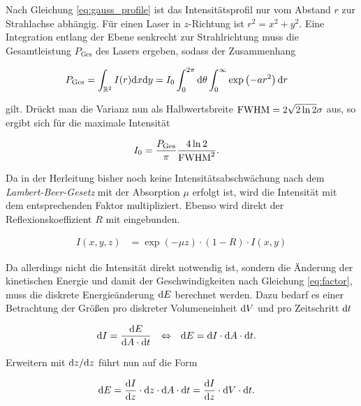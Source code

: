 		Nach Gleichung \eqref{eq:gauss_profile} ist das Intensitätsprofil nur vom Abstand $r$
		zur Strahlachse abhängig. Für einen Laser in $z$-Richtung ist $r^2 = x^2 + y^2$. Eine
		Integration entlang der Ebene senkrecht zur Strahlrichtung muss die Gesamtleistung
		$P_\text{Ges}$ des Lasers ergeben, sodass der Zusammenhang

		\begin{align}
			P_\text{Ges} &= \int_{\mathbb{R}^2} I(r) \dx\dx[y]
				= I_0 \int_0^{2\pi} \dx[\theta] \int_0^\infty \exp\left(-a r^2\right) \dx[r]
		\end{align}

		gilt. Drückt man die Varianz nun als Halbwertsbreite $\fwhm = 2\sqrt{2 \ln2}\sigma$ aus, so
		ergibt sich für die maximale Intensität

		\begin{align}
			I_0 &= \frac{P_\text{Ges}}{\pi} \frac{4\ln2}{\fwhm^2}
			.
		\end{align}

		Da in der Herleitung bisher noch keine Intensitätsabschwächung nach dem
		\emph{Lambert-Beer-Gesetz} mit der Absorption $\mu$ erfolgt ist, wird die Intensität mit
		dem entsprechenden Faktor multipliziert. Ebenso wird direkt der Reflexionskoeffizient
		$R$ mit eingebunden.

		\begin{align}
			I(x,y,z) &= \exp\left(-\mu z\right) \cdot (1-R) \cdot I(x,y)
			\label{eq:intensity}
		\end{align}

		Da allerdings nicht die Intensität direkt notwendig ist, sondern die Änderung der
		kinetischen Energie und damit der Geschwindigkeiten nach Gleichung \eqref{eq:factor}, muss
		die diskrete Energieänderung $\dx[E]$ berechnet werden. Dazu bedarf es einer Betrachtung
		der Größen pro diskreter Volumeneinheit $\dx[V]$ und pro Zeitschritt $\dt$

		\begin{align}
			\dx[I] &= \frac{\dx[E]}{\dx[A]\cdot\dt}
			&\Leftrightarrow&&
			\dx[E] &= \dx[I] \cdot \dx[A] \cdot \dt
			.
		\end{align}

		Erweitern mit $\dx[z]/\dx[z]$ führt nun auf die Form

		\begin{align}
			\dx[E] &= \frac{\dx[I]}{\dx[z]} \cdot \dx[z] \cdot \dx[A] \cdot \dt
				= \frac{\dx[I]}{\dx[z]} \cdot \dx[V] \cdot \dt
			.
			\label{eq:energy_diff_1}
		\end{align}


